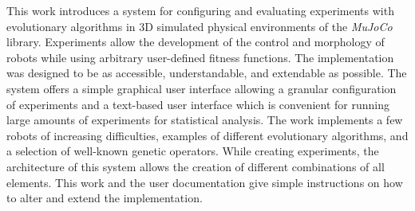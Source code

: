\documentclass[12pt]{report}
\begin{document}
This work introduces a system for configuring and evaluating experiments with
evolutionary algorithms in 3D simulated physical environments of the
\emph{MuJoCo} library. Experiments allow the development of the control and
morphology of robots while using arbitrary user-defined fitness functions. The
implementation was designed to be as accessible, understandable, and extendable
as possible. The system offers a simple graphical user interface allowing a
granular configuration of experiments and a text-based user interface which is
convenient for running large amounts of experiments for statistical analysis.
The work implements a few robots of increasing difficulties, examples of
different evolutionary algorithms, and a selection of well-known genetic
operators. While creating experiments, the architecture of this system allows
the creation of different combinations of all elements. This work and the user
documentation give simple instructions on how to alter and extend the
implementation.
\end{document}
